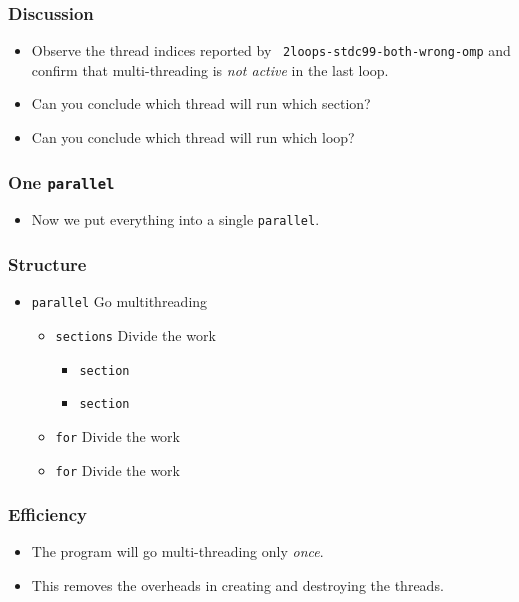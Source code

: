 \documentclass{beamer}
\begin{document}
\begin{frame}
  \frametitle{Discussion}
  \begin{itemize}
  \item Observe the thread indices reported by {\tt
    2loops-stdc99-both-wrong-omp} and confirm that multi-threading is
    {\em not active} in the last loop.
  \item Can you conclude which thread will run which section?
  \item Can you conclude which thread will run which loop?
  \end{itemize}
\end{frame}


\begin{frame}
  \frametitle{One {\tt parallel}}
  \begin{itemize}
  \item Now we put everything into a single {\tt parallel}.
  \end{itemize}
\end{frame}



\begin{frame}
\frametitle{Structure}
\begin{itemize}
\item {\tt parallel} Go multithreading
  \begin{itemize}
  \item {\tt sections} Divide the work
    \begin{itemize}
    \item {\tt section}
    \item {\tt section}
    \end{itemize}
  \item {\tt for} Divide the work
  \item {\tt for} Divide the work
  \end{itemize}
\end{itemize}
\end{frame}

\begin{frame}
\frametitle{Efficiency}
\begin{itemize}
\item The program will go multi-threading only {\em once}.
\item This removes the overheads in creating and destroying the
  threads.
\end{itemize}
\end{frame}
\end{document}
